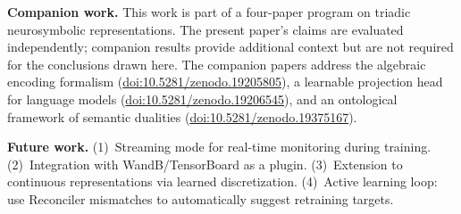 \documentclass[11pt]{article}
\begin{document}
\textbf{Companion work.} This work is part of a four-paper program on triadic neurosymbolic representations. The present paper's claims are evaluated independently; companion results provide additional context but are not required for the conclusions drawn here. The companion papers address the algebraic encoding formalism (\href{https://doi.org/10.5281/zenodo.19205805}{doi:10.5281/zenodo.19205805}), a learnable projection head for language models (\href{https://doi.org/10.5281/zenodo.19206545}{doi:10.5281/zenodo.19206545}), and an ontological framework of semantic dualities (\href{https://doi.org/10.5281/zenodo.19375167}{doi:10.5281/zenodo.19375167}).

\textbf{Future work.} (1)~Streaming mode for real-time monitoring during training. (2)~Integration with WandB/TensorBoard as a plugin. (3)~Extension to continuous representations via learned discretization. (4)~Active learning loop: use Reconciler mismatches to automatically suggest retraining targets.




\end{document}
